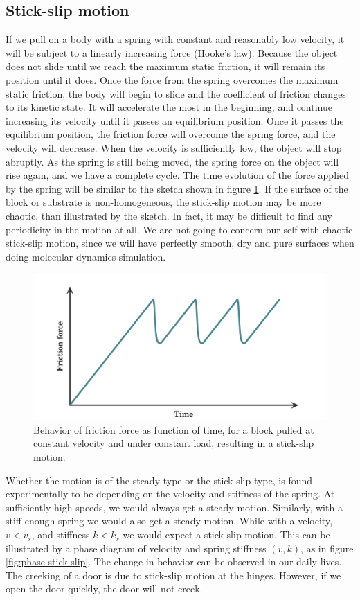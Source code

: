 \documentclass[twoside,english]{uiofysmaster}
\begin{document}
\subsection{Stick-slip motion}
If we pull on a body with a spring with constant and reasonably low velocity, it will be subject to a linearly increasing force (Hooke's law). 
Because the object does not slide until we reach the maximum static friction, it will remain its position until it does.
Once the force from the spring overcomes the maximum static friction, the body will begin to slide and the coefficient of friction changes to its kinetic state.
It will accelerate the most in the beginning, and continue increasing its velocity until it passes an equilibrium position.
Once it passes the equilibrium position, the friction force will overcome the spring force, and the velocity will decrease. 
When the velocity is sufficiently low, the object will stop abruptly. 
As the spring is still being moved, the spring force on the object will rise again, and we have a complete cycle.
The time evolution of the force applied by the spring will be similar to the sketch shown in figure \ref{fig:stick-slip}.
If the surface of the block or substrate is non-homogeneous, the stick-slip motion may be more chaotic, than illustrated by the sketch. In fact, it may be difficult to find any periodicity in the motion at all. We are not going to concern our self with chaotic stick-slip motion, since we will have perfectly smooth, dry and pure surfaces when doing molecular dynamics simulation.  


\begin{figure}[H]
	\centering
	\includegraphics[width=0.7\linewidth]{figures/friction/stick-slip}
	\caption{Behavior of friction force as function of time, for a block pulled at constant velocity and under constant load, resulting in a stick-slip motion.}
	\label{fig:stick-slip}
\end{figure}

Whether the motion is of the steady type or the stick-slip type, is found experimentally to be depending on the velocity and  stiffness of the spring.
At sufficiently high speeds, we would always get a steady motion. 
Similarly, with a stiff enough spring we would also get a steady motion. 
While with a velocity, $v<v_s$, and stiffness $k<k_s$ we would expect a stick-slip motion.
This can be illustrated by a phase diagram of velocity and spring stiffness $(v,k)$, as in figure \ref{fig:phase-stick-slip}.
The change in behavior can be observed in our daily lives. 
The creeking of a door is due to stick-slip motion at the hinges.
However, if we open the door quickly, the door will not creek.  
 
\end{document}
